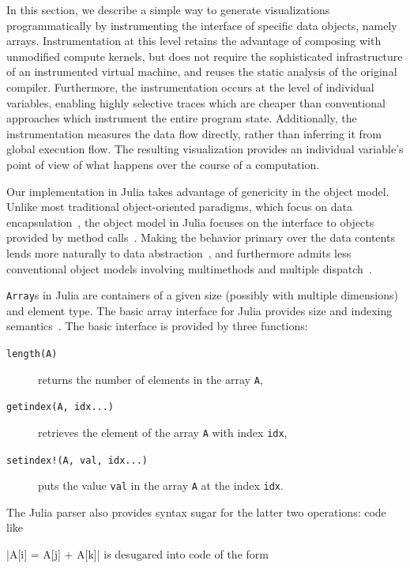 \documentclass{sig-alternate}
\newcommand{\code}[1]{\texttt{#1}}
\begin{document}
In this section, we describe a simple way to generate visualizations
programmatically by instrumenting the interface of specific data objects, namely
arrays. Instrumentation at this level retains the advantage of composing with
unmodified compute kernels, but does not require the sophisticated
infrastructure of an instrumented virtual machine, and reuses the static
analysis of the original compiler. Furthermore, the instrumentation occurs at
the level of individual variables, enabling highly selective traces
which are cheaper than conventional approaches which instrument the entire
program state. Additionally, the instrumentation measures the data flow
directly, rather than inferring it from global execution flow. The resulting
visualization provides an individual variable's point of view of what happens
over the course of a computation.

Our implementation in Julia takes advantage of genericity in the object model.
Unlike most traditional object-oriented paradigms, which focus on data
encapsulation~\cite{Cardelli1985}, the object model in Julia focuses on the
interface to objects provided by method calls~\cite{Mitchell1988}. Making the
behavior primary over the data contents lends more naturally to data
abstraction~\cite{Mitchell1988,Abadi1996}, and furthermore admits less conventional
object models involving multimethods and multiple dispatch~\cite{Castagna1997}.

\code{Array}s in Julia are containers of a given size (possibly with multiple
dimensions) and element type. The basic array interface for Julia provides size
and indexing semantics~\cite{Bezanson2014}. The basic interface is provided by
three functions:

\begin{description}
	\item[\code{length(A)}] returns the number of elements in the array
	      \code{A},
      	\item[\code{getindex(A, idx...)}] retrieves the element of the array
	      \code{A} with index \code{idx},
      	\item[\code{setindex!(A, val, idx...)}] puts the value \code{val} in
	      the array \code{A} at the index \code{idx}.
\end{description}

The Julia parser also provides syntax sugar for the latter two operations: code
like

|A[i] = A[j] + A[k]|
%
is desugared into code of the form
\end{document}
